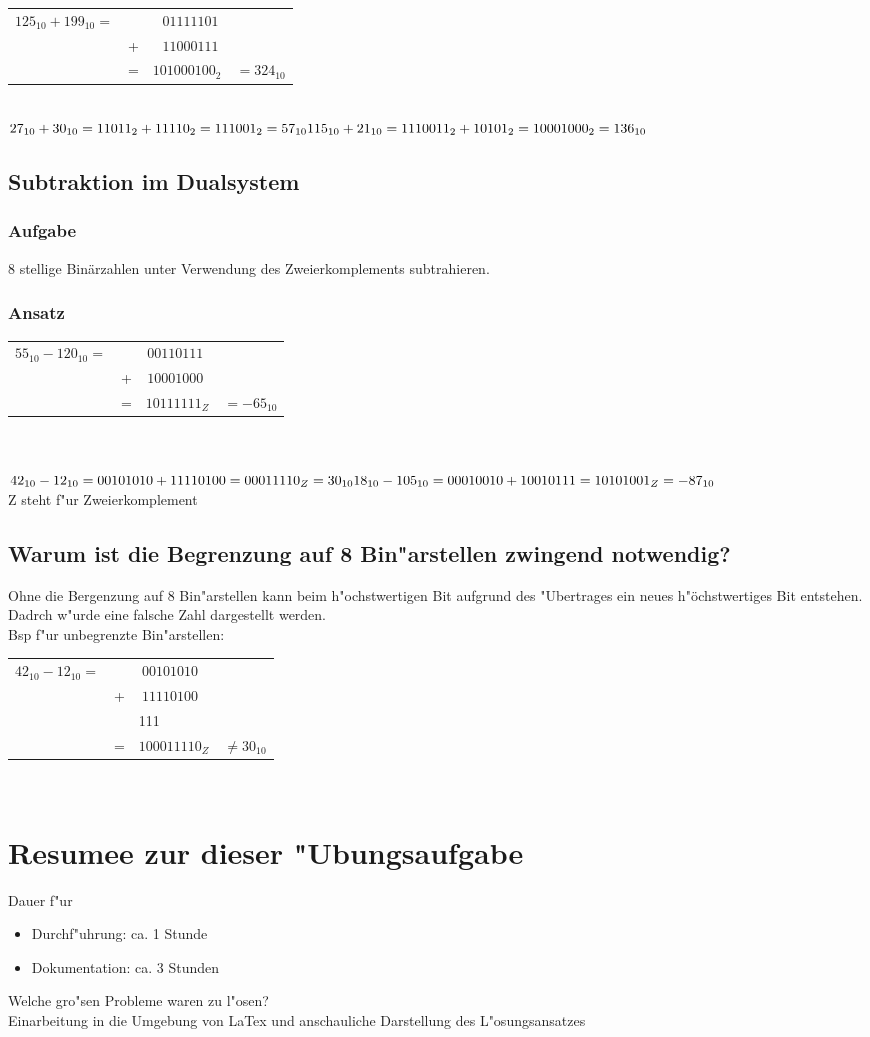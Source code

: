 \documentclass[a4paper,11pt,titlepage]{article}
\begin{document}
\begin{tabular}{lrrc}
$125_{10} + 199_{10} = $&&$01111101\ $\\
&+&$11000111\ $\\
\cline{3-3}
&=&$101000100_2$ &$=324_{10}$\\
\end{tabular}\\
\noindent$27_{10} + 30_{10} = 11011_2 + 11110_2 = 111001_2 = 57_{10}\\
115_{10} + 21_{10} = 1110011_2 + 10101_2 = 10001000_2 = 136_{10}$
\subsection{Subtraktion im Dualsystem}
\subsubsection{Aufgabe}
8 stellige Binärzahlen unter Verwendung des Zweierkomplements subtrahieren.
\subsubsection{Ansatz}
\begin{tabular}{lrrc}
$55_{10} - 120_{10} = $&&$00110111\ \ $\\
&+&$10001000\ \ $\\
\cline{3-3}
&=&$10111111_Z$ &$= -65_{10}$\\
\end{tabular}\\
\\
$42_{10} - 12_{10} = 00101010 + 11110100 = 00011110_Z = 30_{10}\\
18_{10} - 105_{10} = 00010010 + 10010111 = 10101001_Z = -87_{10}$\\
Z steht f"ur Zweierkomplement
\subsection{Warum ist die Begrenzung auf 8 Bin"arstellen zwingend notwendig?}
Ohne die Bergenzung auf 8 Bin"arstellen kann beim h"ochstwertigen Bit aufgrund des "Ubertrages ein neues h"öchstwertiges Bit entstehen. Dadrch w"urde eine falsche Zahl dargestellt werden.\\
Bsp f"ur unbegrenzte Bin"arstellen:\\
\begin{tabular}{lrlc}
$42_{10} - 12_{10} = $&&$\ 00101010 $\\
&+&$\ 11110100$\\
&&\footnotesize111\\
\cline{3-3}
&=&$100011110_Z$ &$\neq 30_{10}$\\
\end{tabular}\\
\section{Resumee zur dieser "Ubungsaufgabe}
Dauer f"ur 
\begin{itemize}
	\item Durchf"uhrung: ca. 1 Stunde
	\item Dokumentation: ca. 3 Stunden
\end{itemize}
Welche gro"sen Probleme waren zu l"osen?\\
Einarbeitung in die Umgebung von LaTex und anschauliche Darstellung des L"osungsansatzes
\end{document}
